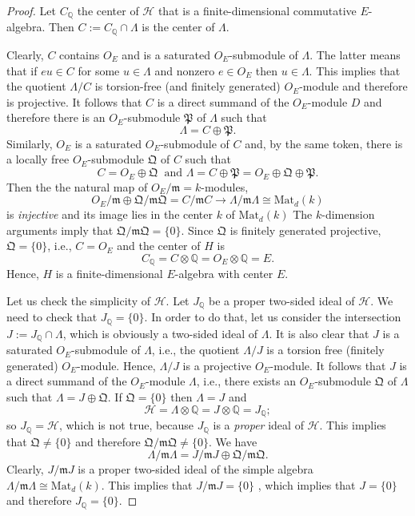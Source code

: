 \documentclass[12pt,a4paper,reqno]{amsart}
\def\Q{{\mathbb Q}}
\def\Mat{\mathrm{Mat}}
\theoremstyle{definition}
\begin{document}
\begin{proof} Let $C_{\Q}$ the center of $\mathcal{H}$ that is a finite-dimensional commutative $E$-algebra.
Then $C:=C_{\Q}\cap \Lambda$ is the center of $\Lambda$.

Clearly, $C$  contains $O_E$ and is a saturated $O_E$-submodule of $\Lambda$. The latter means that
if $e u \in C$ for some $u\in \Lambda$ and   nonzero $e\in O_E$ then $u \in \Lambda$. This implies that the quotient $\Lambda/C$ is torsion-free (and finitely generated)
$O_E$-module and therefore is projective. 
It follows that $C$ is a direct summand of the $O_E$-module  $D$ and therefore there is an $O_E$-submodule $\mathfrak{P}$ of $\Lambda$ such that
$$\Lambda=C\oplus \mathfrak{P}.$$
Similarly, $O_E$ is a saturated $O_E$-submodule of $C$ and, by the same token, there is a locally free $O_E$-submodule $\mathfrak{Q}$ of $C$ such that
$$C=O_E\oplus \mathfrak{Q} \ \text{ and } \Lambda=C\oplus \mathfrak{P}=O_E\oplus \mathfrak{Q}\oplus  \mathfrak{P}.$$
Then the the natural map of $O_E/\mathfrak{m}=k$-modules,
$$O_E/ \mathfrak{m}\oplus  \mathfrak{Q}/ \mathfrak{m}   \mathfrak{Q} = C/\mathfrak{m}C   \to \Lambda/\mathfrak{m}\Lambda\cong \Mat_d(k)$$
 is {\sl injective}
and its image lies in the center $k$ of $\Mat_d(k)$
The $k$-dimension arguments imply that  $\mathfrak{Q}/ \mathfrak{m}   \mathfrak{Q}=\{0\}$. Since $\mathfrak{Q}$ is finitely generated projective,
$\mathfrak{Q}=\{0\}$, i.e.,  
$C=O_E$ and the center of $H$ is 
$$C_{\Q}=C\otimes \Q=O_E\otimes\Q=E.$$
Hence, $H$ is a finite-dimensional
$E$-algebra with center $E$.

Let us check the simplicity of $\mathcal{H}$. Let $J_{\Q}$ be a proper two-sided ideal of $\mathcal{H}$. We need to check that $J_{\Q}=\{0\}$.
In order to do that, let us consider the intersection $J:=J_{\Q}\cap \Lambda$, which is obviously a two-sided ideal of $\Lambda$.
It is also clear that $J$ is a saturated $O_E$-submodule of $\Lambda$, i.e., the quotient $\Lambda/J$ is a torsion free (finitely generated)
$O_E$-module. Hence, $\Lambda/J$ is a projective $O_E$-module. It follows that $J$ is a direct summand of the $O_E$-module $\Lambda$,
i.e., there exists an $O_E$-submodule $\mathfrak{Q}$ of $\Lambda$ such that $\Lambda=J\oplus \mathfrak{Q}$. If $\mathfrak{Q}=\{0\}$
then $\Lambda=J$ and
$$\mathcal{H}=\Lambda\otimes \Q=J\otimes\Q=J_{\Q};$$
so $J_{\Q}=\mathcal{H}$, which is not true, because $J_{\Q}$ is a {\sl proper} ideal of $\mathcal{H}$.
This implies that
$\mathfrak{Q}\ne \{0\}$ and therefore $\mathfrak{Q}/\mathfrak{m}\mathfrak{Q}\ne \{0\}$. We have 
$$\Lambda/\mathfrak{m}\Lambda=J/\mathfrak{m}J \oplus \mathfrak{Q}/\mathfrak{m}\mathfrak{Q}.$$
Clearly, $J/\mathfrak{m}J$ is a proper two-sided ideal of the simple  algebra $\Lambda/\mathfrak{m}\Lambda\cong \Mat_d(k)$.
This implies that $J/\mathfrak{m}J=\{0\}$ , which implies that $J=\{0\}$ and therefore $J_{\Q}=\{0\}$.


\end{proof}
\end{document}
